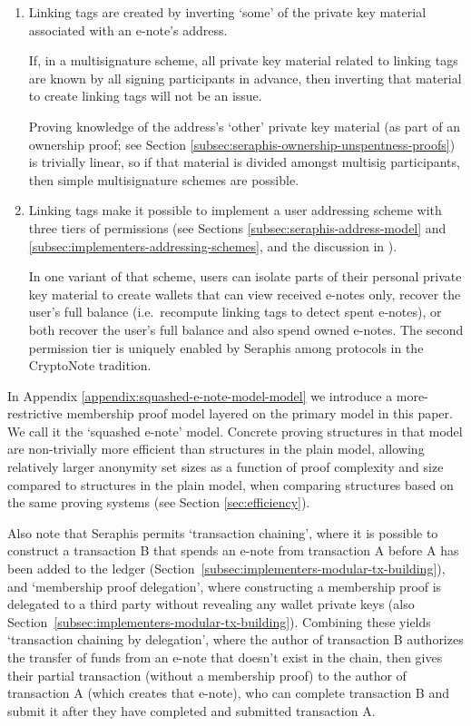 \begin{enumerate}
    \item Linking tags are created by inverting `some' of the private key material associated with an e-note's address.

    If, in a multisignature scheme, all private key material related to linking tags are known by all signing participants in advance, then inverting that material to create linking tags will not be an issue.

    Proving knowledge of the address's `other' private key material (as part of an ownership proof; see Section \ref{subsec:seraphis-ownership-unspentness-proofs}) is trivially linear, so if that material is divided amongst multisig participants, then simple multisignature schemes are possible.

    \item Linking tags make it possible to implement a user addressing scheme with three tiers of permissions (see Sections \ref{subsec:seraphis-address-model} and \ref{subsec:implementers-addressing-schemes}, and the discussion in \cite{seraphis-address-schemes-mrl-92}).

    In one variant of that scheme, users can isolate parts of their personal private key material to create wallets that can view received e-notes only, recover the user's full balance (i.e.\ recompute linking tags to detect spent e-notes), or both recover the user's full balance and also spend owned e-notes. The second permission tier is uniquely enabled by Seraphis among protocols in the CryptoNote tradition.
\end{enumerate}

In Appendix \ref{appendix:squashed-e-note-model-model} we introduce a more-restrictive membership proof model layered on the primary model in this paper. We call it the `squashed e-note' model. Concrete proving structures in that model are non-trivially more efficient than structures in the plain model, allowing relatively larger anonymity set sizes as a function of proof complexity and size compared to structures in the plain model, when comparing structures based on the same proving systems (see Section \ref{sec:efficiency}).

Also note that Seraphis permits `transaction chaining', where it is possible to construct a transaction B that spends an e-note from transaction A before A has been added to the ledger (Section~\ref{subsec:implementers-modular-tx-building}), and `membership proof delegation', where constructing a membership proof is delegated to a third party without revealing any wallet private keys (also Section~\ref{subsec:implementers-modular-tx-building}). Combining these yields `transaction chaining by delegation', where the author of transaction B authorizes the transfer of funds from an e-note that doesn't exist in the chain, then gives their partial transaction (without a membership proof) to the author of transaction A (which creates that e-note), who can complete transaction B and submit it after they have completed and submitted transaction A.


